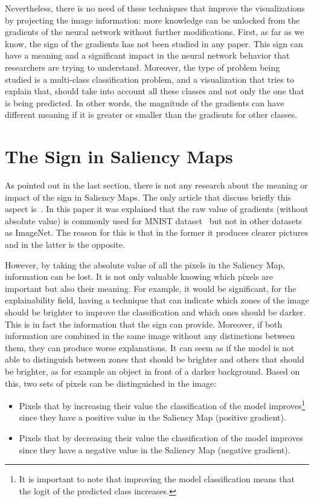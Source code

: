 \documentclass[preprint,12pt]{elsarticle}
\begin{document}
Nevertheless, there is no need of these techniques that improve the visualizations by projecting the image information: more knowledge can be unlocked from the gradients of the neural network without further modifications. First, as far as we know, the sign of the gradients has not been studied in any paper. This sign can have a meaning and a significant impact in the neural network behavior that researchers are trying to understand. Moreover, the type of problem being studied is a multi-class classification problem, and a visualization that tries to explain that, should take into account all these classes and not only the one that is being predicted. In other words, the magnitude of the gradients can have different meaning if it is greater or smaller than the gradients for other classes. 

\section{The Sign in Saliency Maps}
\label{sec:the sign in saliency maps}
As pointed out in the last section, there is not any research about the meaning or impact of the sign in Saliency Maps. The only article that discuss briefly this aspect is~\cite{smilkovSmoothGradRemovingNoise}. In this paper it was explained that the raw value of gradients (without absolute value) is commonly used for MNIST dataset~\cite{MNISTHandwrittenDigit} but not in other datasets as ImageNet. The reason for this is that in the former it produces clearer pictures and in the latter is the opposite. 

However, by taking the absolute value of all the pixels in the Saliency Map, information can be lost. It is not only valuable knowing which pixels are important but also their meaning. For example, it would be significant, for the explainability field, having a technique that can indicate which zones of the image should be brighter to improve the classification and which ones should be darker. This is in fact the information that the sign can provide. Moreover, if both information are combined in the same image without any distinctions between them, they can produce worse explanations. It can seem as if the model is not able to distinguish between zones that should be brighter and others that should be brighter, as for example an object in front of a darker background. Based on this, two sets of pixels can be distinguished in the image:

\begin{itemize}
    \item Pixels that by increasing their value the classification of the model improves\footnote{It is important to note that improving the model classification means that the logit of the predicted class increases. } since they have a positive value in the Saliency Map (positive gradient).
    \item Pixels that by decreasing their value the classification of the model improves since they have a negative value in the Saliency Map (negative gradient).
\end{itemize}
\end{document}
